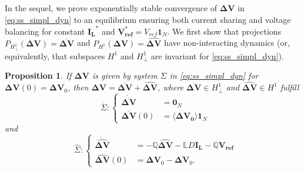 \documentclass[a4paper]{article}
\theoremstyle{plain}
\newtheorem{prp}{Proposition}
\begin{document}
In the sequel, we prove exponentially stable convergence of
$\mathbf{\Delta V}$ in \eqref{eq:ss_simpl_dyn} to an equilibrium
ensuring both current sharing and voltage balancing for constant
$\mathbf{I_L}^*$ and $\mathbf{V^*_{ref}} = V_{ref}\mathbf{1}_N$. We first show that projections $P_{H^1_{\perp}}(\mathbf{\Delta V}) = \mathbf{\overline{\Delta V}}$ and $P_{H^1}(\mathbf{\Delta V}) = \mathbf{\widehat{\mathbf{\Delta V}}}$ have non-interacting dynamics (or, equivalently, that subspaces $H^1$ and $H^1_{\perp}$ are invariant for \eqref{eq:ss_simpl_dyn}).
\begin{prp}
	\label{pr:invariant}
	If $\mathbf{\Delta V}$ is given by system $\Sigma$ in
	\eqref{eq:ss_simpl_dyn} for $\mathbf{\Delta V}(0) = \mathbf{ \Delta
		V}_0$, then $\mathbf{\Delta V} = \mathbf{\overline{\Delta V}} + \mathbf{\widehat{\Delta V}}$, where $\mathbf{\overline{\Delta V}}\in H_{\perp}^1$ and $\mathbf{\widehat{\Delta V}}\in H^1$ fulfill
	\begin{equation}
	\label{eq:subsysDGUi}
	\text{ $\overline\Sigma:$}\left\lbrace
	\begin{aligned}
	\mathbf{ {\dot{\overline{\Delta V}}}} &= \mathbf{0}_N\\
	\mathbf{\overline{ \Delta V}}(0) &=\mathbf{\langle{\Delta V_0}\rangle}\mathbf{1}_N
	\end{aligned}
	\right.
	\end{equation} and
	\begin{equation}
	\label{eq:simpl_initial_state_H1}            
	\text{ $\widehat\Sigma:$}\left\lbrace
	\begin{aligned}
	\mathbf{\dot{\widehat{ \Delta V}}} &= -{ \mathbb{Q}}\mathbf{\widehat{\Delta V}}-{\mathbb{L}}D\mathbf{{I_{L}}}-{\mathbb{Q}}\mathbf{{V_{ref}}}\\
	\mathbf{\widehat{ \Delta V}}(0) &=\mathbf{{ \Delta V}}_0 - \mathbf{\overline{ \Delta V}}_0.
	\end{aligned}
	\right.
	\end{equation}
\end{prp}
\end{document}
